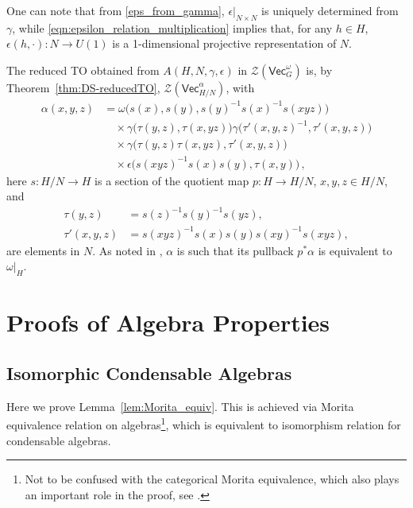 \documentclass[aps,twocolumn,prx,floatfix,preprintnumbers, nofootinbib,10pt]{revtex4-2}
\numberwithin{equation}{section}
\theoremstyle{definition}
\newcommand{\be}{\begin{equation}}
\newcommand{\ee}{\end{equation}}
\newcommand{\ba}{\begin{aligned}}
\newcommand{\ea}{\end{aligned}}
\newcommand{\nn}{\nonumber}
\newcommand{\cC}{\mathcal{C}}
\newcommand{\cZ}{\mathcal{Z}}
\renewcommand{\Vec}{\mathsf{Vec}}
\newcommand{\eps}{\epsilon}
\begin{document}
One can note that from \eqref{eps_from_gamma}, $\eps|_{N\times N}$ is uniquely determined from $\gamma$, while \eqref{eqn:epsilon_relation_multiplication} implies that, for any $h\in H$, $\eps(h,\cdot):N\to U(1)$ is a 1-dimensional projective representation of $N$.


The reduced TO obtained from $A(H, N, \gamma, \epsilon)$ in $\cZ(\Vec_G^\omega
)$ is, by Theorem~\ref{thm:DS-reducedTO}, $\cZ(\Vec_{H/N}^\alpha)$, with
\begin{align} \label{eqn:twist_reduced_TO}
    	\alpha(x,y,z) & = \omega \bigl(s(x),s(y),s(y)^{-1}s(x)^{-1}s(xyz)\bigr)\nn\\
        & \quad \times \gamma\bigl(\tau(y,z),\tau(x,yz)\bigr)\gamma\bigl( \tau'(x,y,z)^{-1},\tau'(x,y,z) \bigr)\nn\\
        & \quad \times \gamma\bigl( \tau(y,z)\tau(x,yz),\tau'(x,y,z) \bigr)\nn\\
    	& \quad \times \epsilon\bigl( s(xyz)^{-1}s(x)s(y), \tau(x,y) \bigr)\,,
    \end{align}
    here $s:H/N\rightarrow H$ is a section of the quotient map $p:H\rightarrow H/N$, $x,y,z\in H/N$, and 
    \be
    \ba
     \tau(y,z) & = s(z)^{-1}s(y)^{-1}s(yz),\\
        \tau'(x,y,z)&= s(xyz)^{-1}s(x)s(y)s(xy)^{-1}s(xyz),
    \ea
    \ee
    are elements in $N$. As noted in \cite{Hannah:2023tae}, $\alpha$ is such that its pullback $p^*\alpha$ is equivalent to $\omega|_H$.



\section{Proofs of Algebra Properties}

\subsection{Isomorphic Condensable Algebras}
\label{append:alg_Morita_equiv}
Here we prove Lemma~\ref{lem:Morita_equiv}. 
This is achieved via Morita equivalence relation on algebras\footnote{Not to be confused with the categorical Morita equivalence, which also plays an important role in the proof, see \cite{EGNO}.}, which is equivalent to isomorphism relation for condensable algebras.

\end{document}
